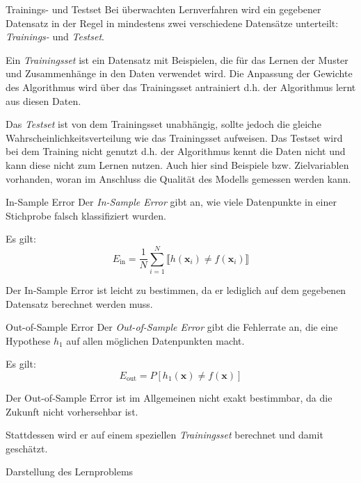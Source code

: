 \begin{defi}{Trainings- und Testset}
    Bei überwachten Lernverfahren wird ein gegebener Datensatz in der Regel in mindestens zwei verschiedene Datensätze unterteilt: \emph{Trainings-} und \emph{Testset}.

    Ein \emph{Trainingsset} ist ein Datensatz mit Beispielen, die für das Lernen der Muster und Zusammenhänge in den Daten verwendet wird.
    Die Anpassung der Gewichte des Algorithmus wird über das Trainingsset antrainiert d.h. der Algorithmus lernt aus diesen Daten.

    Das \emph{Testset} ist von dem Trainingsset unabhängig, sollte jedoch die gleiche Wahrscheinlichkeitsverteilung wie das Trainingsset aufweisen.
    Das Testset wird bei dem Training nicht genutzt d.h. der Algorithmus kennt die Daten nicht und kann diese nicht zum Lernen nutzen. Auch hier sind Beispiele bzw. Zielvariablen vorhanden, woran im Anschluss die Qualität des Modells gemessen werden kann.
\end{defi}

\begin{defi}{In-Sample Error}
    Der \emph{In-Sample Error} gibt an, wie viele Datenpunkte in einer Stichprobe falsch klassifiziert wurden.

    Es gilt:
    \[
        E_\text{in} = \frac{1}{N} \sum_{i=1}^N \llbracket h(\mathbf{x}_i) \neq f(\mathbf{x}_i) \rrbracket
    \]

    Der In-Sample Error ist leicht zu bestimmen, da er lediglich auf dem gegebenen Datensatz berechnet werden muss.
\end{defi}

\begin{defi}{Out-of-Sample Error}
    Der \emph{Out-of-Sample Error} gibt die Fehlerrate an, die eine Hypothese $h_1$ auf allen möglichen Datenpunkten macht.

    Es gilt:
    \[
        E_\text{out} = P[h_1(\mathbf{x}) \neq f(\mathbf{x})]
    \]

    Der Out-of-Sample Error ist im Allgemeinen nicht exakt bestimmbar, da die Zukunft nicht vorhersehbar ist.

    Stattdessen wird er auf einem speziellen \emph{Trainingsset} berechnet und damit geschätzt.
\end{defi}

\begin{bonus}{Darstellung des Lernproblems}

\end{bonus}

